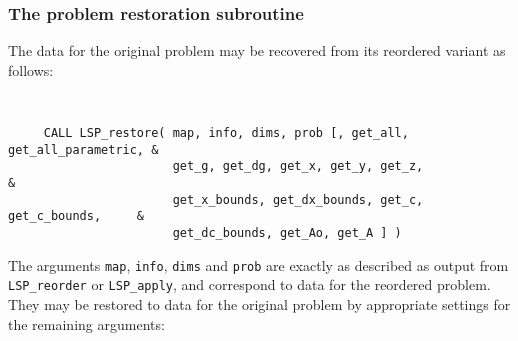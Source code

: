 \documentclass{galahad}
\newcommand{\packagename}{LSP}
\begin{document}
\subsubsection{The  problem restoration subroutine}
The data for the original problem may be recovered from its reordered 
variant as follows:
\vspace*{-2mm}
{\tt 
\begin{verbatim}
     CALL LSP_restore( map, info, dims, prob [, get_all, get_all_parametric, &
                       get_g, get_dg, get_x, get_y, get_z,                   &
                       get_x_bounds, get_dx_bounds, get_c, get_c_bounds,     &
                       get_dc_bounds, get_Ao, get_A ] )
\end{verbatim}
}
\vspace*{-1mm}
\noindent
The arguments {\tt map}, {\tt info}, {\tt dims} and {\tt prob} are 
exactly as described as output from 
{\tt \packagename\_reorder} or {\tt \packagename\_apply},
and correspond to data for the reordered problem. 
They may be restored to data for the original problem by appropriate 
settings for the remaining arguments: 
\end{document}
